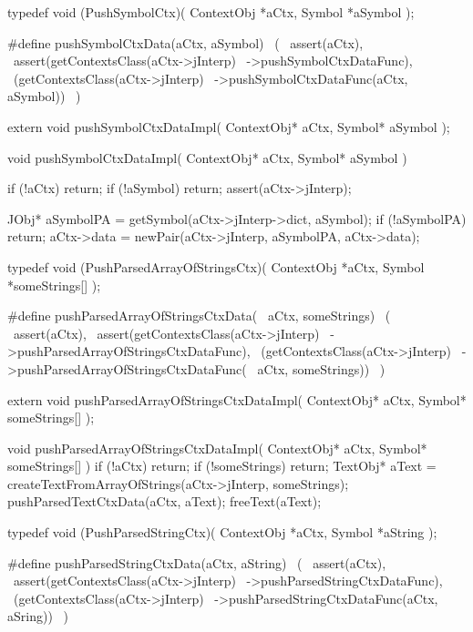 \startCHeader
typedef void (PushSymbolCtx)(
  ContextObj *aCtx,
  Symbol     *aSymbol
);

#define pushSymbolCtxData(aCtx, aSymbol)      \
  (                                           \
    assert(aCtx),                             \
    assert(getContextsClass(aCtx->jInterp)    \
      ->pushSymbolCtxDataFunc),               \
    (getContextsClass(aCtx->jInterp)          \
      ->pushSymbolCtxDataFunc(aCtx, aSymbol)) \
  )
\stopCHeader

\setCHeaderStream{private}
\startCHeader
extern void pushSymbolCtxDataImpl(
  ContextObj* aCtx,
  Symbol* aSymbol
);
\stopCHeader
\setCHeaderStream{public}

\startCCode
void pushSymbolCtxDataImpl(
  ContextObj* aCtx,
  Symbol* aSymbol
) {
  if (!aCtx) return;
  if (!aSymbol) return;
  assert(aCtx->jInterp);

  JObj* aSymbolPA =
    getSymbol(aCtx->jInterp->dict, aSymbol);
  if (!aSymbolPA) return;
  aCtx->data = newPair(aCtx->jInterp, aSymbolPA, aCtx->data);
}
\stopCCode

\startCHeader
typedef void (PushParsedArrayOfStringsCtx)(
  ContextObj *aCtx,
  Symbol     *someStrings[]
);

#define pushParsedArrayOfStringsCtxData(      \
  aCtx, someStrings)                          \
  (                                           \
    assert(aCtx),                             \
    assert(getContextsClass(aCtx->jInterp)    \
      ->pushParsedArrayOfStringsCtxDataFunc), \
    (getContextsClass(aCtx->jInterp)          \
      ->pushParsedArrayOfStringsCtxDataFunc(  \
        aCtx, someStrings))                   \
  )
\stopCHeader

\startCHeader
extern void pushParsedArrayOfStringsCtxDataImpl(
  ContextObj* aCtx,
  Symbol* someStrings[]
);
\stopCHeader
\setCHeaderStream{public}

\startCCode
void pushParsedArrayOfStringsCtxDataImpl(
  ContextObj* aCtx,
  Symbol* someStrings[]
) {
  if (!aCtx) return;
  if (!someStrings) return;
  TextObj* aText =
    createTextFromArrayOfStrings(aCtx->jInterp, someStrings);
  pushParsedTextCtxData(aCtx, aText);
  freeText(aText);
}
\stopCCode

\startCHeader
typedef void (PushParsedStringCtx)(
  ContextObj *aCtx,
  Symbol     *aString
);

#define pushParsedStringCtxData(aCtx, aString)      \
  (                                                 \
    assert(aCtx),                                   \
    assert(getContextsClass(aCtx->jInterp)          \
      ->pushParsedStringCtxDataFunc),               \
    (getContextsClass(aCtx->jInterp)                \
      ->pushParsedStringCtxDataFunc(aCtx, aSring))  \
  )
\stopCHeader

